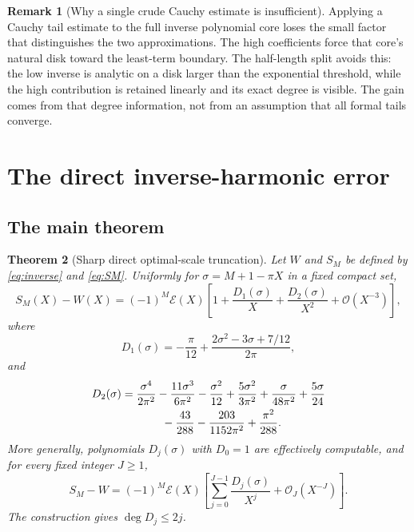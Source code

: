 \documentclass[11pt,a4paper]{article}
\newtheorem{theorem}{Theorem}[section]
\theoremstyle{definition}
\newtheorem{remark}[theorem]{Remark}
\numberwithin{equation}{section}
\newcommand{\Oh}{\mathcal O}
\newcommand{\scal}{\mathcal E}
\begin{document}
\begin{remark}[Why a single crude Cauchy estimate is insufficient]
Applying a Cauchy tail estimate to the full inverse polynomial core loses the small factor that distinguishes the two approximations. The high coefficients force that core's natural disk toward the least-term boundary. The half-length split avoids this: the low inverse is analytic on a disk larger than the exponential threshold, while the high contribution is retained linearly and its exact degree is visible. The gain comes from that degree information, not from an assumption that all formal tails converge.
\end{remark}

\section{The direct inverse-harmonic error}
\label{sec:direct}

\subsection{The main theorem}
\begin{theorem}[Sharp direct optimal-scale truncation]
\label{thm:direct}
Let $W$ and $S_M$ be defined by \eqref{eq:inverse} and \eqref{eq:SM}. Uniformly for $\sigma=M+1-\pi X$ in a fixed compact set,
\begin{equation}
 S_M(X)-W(X)=(-1)^M\scal(X)
 \left[1+\frac{D_1(\sigma)}X+\frac{D_2(\sigma)}{X^2}
                  +\Oh(X^{-3})\right],
 \label{eq:direct2}
\end{equation}
where
\begin{equation}
 D_1(\sigma)=-\frac\pi{12}
       +\frac{2\sigma^2-3\sigma+7/12}{2\pi},
 \label{eq:D1}
\end{equation}
and
\begin{align}
 D_2(\sigma)={}&
 \frac{\sigma^4}{2\pi^2}-\frac{11\sigma^3}{6\pi^2}
 -\frac{\sigma^2}{12}+\frac{5\sigma^2}{3\pi^2}
 +\frac{\sigma}{48\pi^2}+\frac{5\sigma}{24}
 \notag\\
 &\hspace{8mm}-\frac{43}{288}-\frac{203}{1152\pi^2}
                         +\frac{\pi^2}{288}.
 \label{eq:D2}
\end{align}
More generally, polynomials $D_j(\sigma)$ with $D_0=1$ are effectively computable, and for every fixed integer $J\ge1$,
\begin{equation}
 S_M-W=(-1)^M\scal(X)
 \left[\sum_{j=0}^{J-1}\frac{D_j(\sigma)}{X^j}
                  +\Oh_J(X^{-J})\right].
 \label{eq:directall}
\end{equation}
The construction gives $\deg D_j\le2j$.
\end{theorem}
\end{document}
